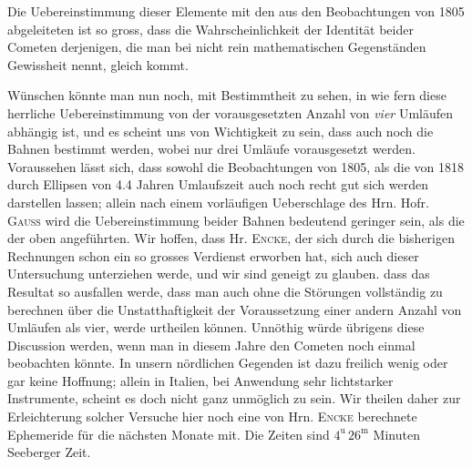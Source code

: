 \par\indent Die Uebereinstimmung dieser Elemente mit den aus den Beobachtungen von 1805 abgeleiteten ist
so gross, dass die Wahrscheinlichkeit der Identität beider Cometen derjenigen, die man bei nicht rein
mathematischen Gegenständen Gewissheit nennt, gleich kommt.

\par\indent Wünschen könnte man nun noch, mit Bestimmtheit zu sehen, in wie fern diese herrliche Uebereinstimmung
von der vorausgesetzten Anzahl von \emph{vier} Umläufen abhängig ist, und es scheint uns von Wichtigkeit zu
sein, dass auch noch die Bahnen bestimmt werden, wobei nur drei Umläufe vorausgesetzt werden.
Voraussehen lässt sich, dass sowohl die Beobachtungen von 1805, als die von 1818 durch Ellipsen von
4.4 Jahren Umlaufszeit auch noch recht gut sich werden darstellen lassen; allein nach einem vorläufigen
Ueberschlage des Hrn. Hofr. \textsc{Gauss} wird die Uebereinstimmung beider Bahnen bedeutend geringer sein,
als die der oben angeführten. Wir hoffen, dass Hr. \textsc{Encke}, der sich durch die bisherigen Rechnungen
schon ein so grosses Verdienst erworben hat, sich auch dieser Untersuchung unterziehen werde, und wir
sind geneigt zu glauben. 
dass das Resultat so ausfallen werde, dass man auch ohne die Störungen
vollständig zu berechnen über die Unstatthaftigkeit der Voraussetzung einer andern Anzahl von Umläufen
als vier, werde urtheilen können. Unnöthig würde übrigens diese Discussion werden, wenn man in diesem
Jahre den Cometen noch einmal beobachten könnte. In unsern nördlichen Gegenden ist dazu freilich wenig
oder gar keine Hoffnung; allein in Italien, bei Anwendung sehr lichtstarker Instrumente, scheint es doch
nicht ganz unmöglich zu sein. Wir theilen daher zur Erleichterung solcher Versuche hier noch eine von
Hrn. \textsc{Encke} berechnete Ephemeride für die nächsten Monate mit. Die Zeiten sind $4^{\mathrm{u}}\,26^{\mathrm{m}}$ Minuten
Seeberger Zeit.
\nopagebreak[4]
